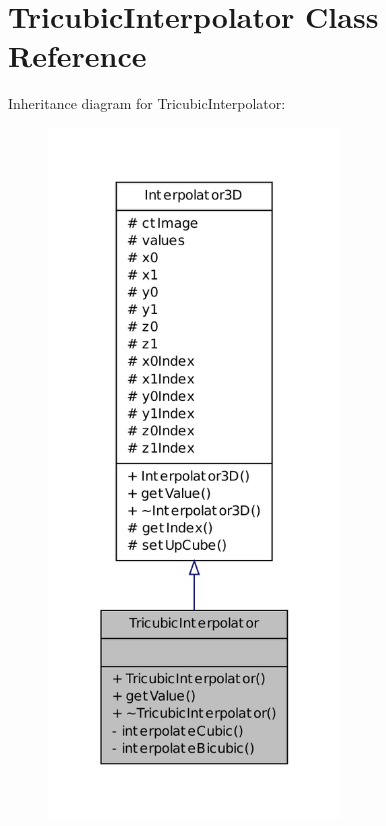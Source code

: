 \hypertarget{class_tricubic_interpolator}{
\section{TricubicInterpolator Class Reference}
\label{class_tricubic_interpolator}
}


Inheritance diagram for TricubicInterpolator:
\nopagebreak
\begin{figure}[H]
\begin{center}
\leavevmode
\includegraphics[width=220pt]{class_tricubic_interpolator__inherit__graph}
\end{center}
\end{figure}


